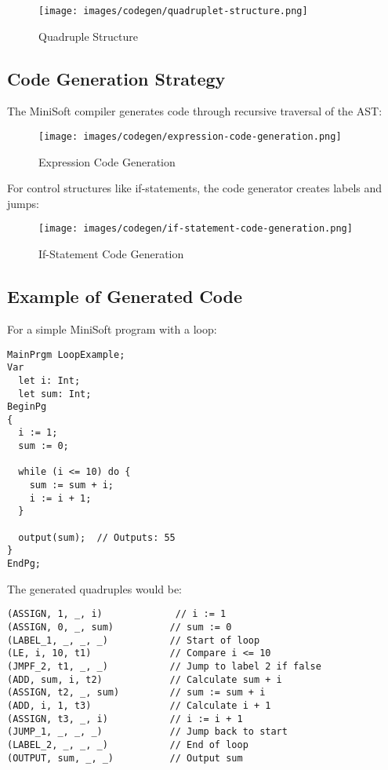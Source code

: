 \documentclass[12pt,a4paper]{article}
\begin{document}
\begin{figure}[H]
	\centering
	\texttt{[image: images/codegen/quadruplet-structure.png]}
	\caption{Quadruple Structure}
\end{figure}

\subsection{Code Generation Strategy}
The MiniSoft compiler generates code through recursive traversal of the AST:

\begin{figure}[H]
	\centering
	\texttt{[image: images/codegen/expression-code-generation.png]}
	\caption{Expression Code Generation}
\end{figure}

For control structures like if-statements, the code generator creates labels and jumps:

\begin{figure}[H]
	\centering
	\texttt{[image: images/codegen/if-statement-code-generation.png]}
	\caption{If-Statement Code Generation}
\end{figure}

\subsection{Example of Generated Code}
For a simple MiniSoft program with a loop:

\begin{lstlisting}[caption={Sample MiniSoft Program}]
MainPrgm LoopExample;
Var
  let i: Int;
  let sum: Int;
BeginPg
{
  i := 1;
  sum := 0;
  
  while (i <= 10) do {
    sum := sum + i;
    i := i + 1;
  }
  
  output(sum);  // Outputs: 55
}
EndPg;
\end{lstlisting}

The generated quadruples would be:

\begin{lstlisting}[caption={Generated Quadruples}]
(ASSIGN, 1, _, i)             // i := 1
(ASSIGN, 0, _, sum)          // sum := 0
(LABEL_1, _, _, _)           // Start of loop
(LE, i, 10, t1)              // Compare i <= 10
(JMPF_2, t1, _, _)           // Jump to label 2 if false
(ADD, sum, i, t2)            // Calculate sum + i
(ASSIGN, t2, _, sum)         // sum := sum + i
(ADD, i, 1, t3)              // Calculate i + 1
(ASSIGN, t3, _, i)           // i := i + 1
(JUMP_1, _, _, _)            // Jump back to start
(LABEL_2, _, _, _)           // End of loop
(OUTPUT, sum, _, _)          // Output sum
\end{lstlisting}
\end{document}
